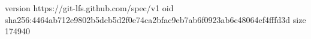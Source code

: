version https://git-lfs.github.com/spec/v1
oid sha256:4464ab712e9802b5dcb5d2f0e74ca2bfac9eb7ab6f0923ab6c48064ef4fffd3d
size 174940
